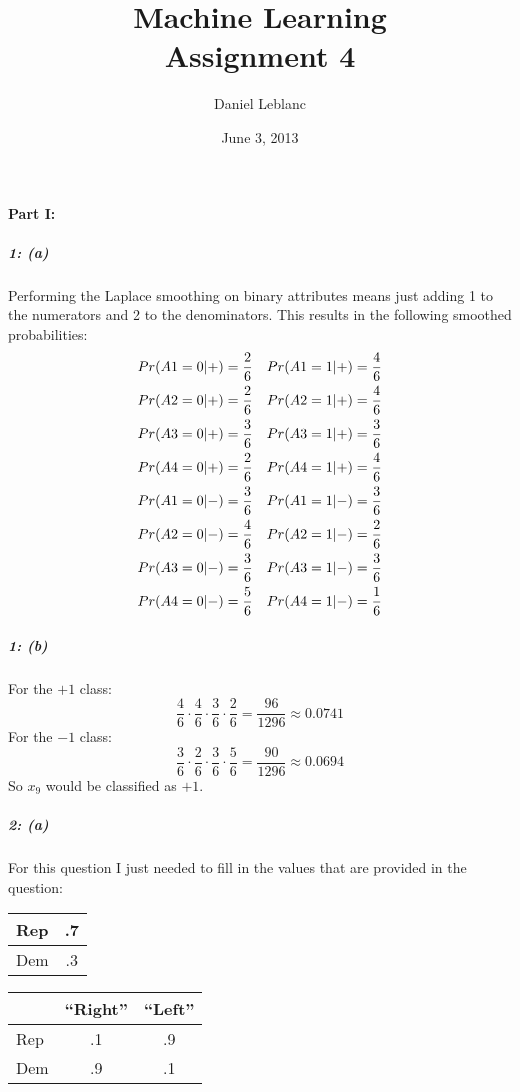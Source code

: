 \documentclass[11pt]{article}
\title{Machine Learning\\ Assignment 4}
\author{Daniel Leblanc}
\date{June 3, 2013}
\begin{document}
\maketitle

\paragraph{Part I:}
\subparagraph{1: (a)} Performing the Laplace smoothing on binary attributes means just adding 1 to the numerators and 2 to the denominators.  This results in the following smoothed probabilities:
\begin{align}
  Pr(A1=0|+) &= \frac26 &  Pr(A1=1|+) &= \frac46 \notag\\
  Pr(A2=0|+) &= \frac26 &  Pr(A2=1|+) &= \frac46 \notag\\
  Pr(A3=0|+) &= \frac36 &  Pr(A3=1|+) &= \frac36 \notag\\
  Pr(A4=0|+) &= \frac26 &  Pr(A4=1|+) &= \frac46 \notag\\
  Pr(A1=0|-) &= \frac36 &  Pr(A1=1|-) &= \frac36 \notag\\
  Pr(A2=0|-) &= \frac46 &  Pr(A2=1|-) &= \frac26 \notag\\
  Pr(A3=0|-) &= \frac36 &  Pr(A3=1|-) &= \frac36 \notag\\
  Pr(A4=0|-) &= \frac56 &  Pr(A4=1|-) &= \frac16 \notag
\end{align}
\subparagraph{1: (b)} For the $+1$ class:
\[\frac46 \cdot \frac46 \cdot \frac36 \cdot \frac26 = \frac{96}{1296} \approx 0.0741\]
For the $-1$ class:
\[\frac36 \cdot \frac26 \cdot \frac36 \cdot \frac56 = \frac{90}{1296} \approx 0.0694\]
So $x_9$ would be classified as $+1$.

\subparagraph{2: (a)} For this question I just needed to fill in the values that are provided in the question:
\begin{center}
\begin{tabular}{|l|c|}
  \hline Rep & .7 \\
  \hline Dem & .3 \\
  \hline
\end{tabular}
\end{center}

\begin{center}
\begin{tabular}{|l|c|c|}
  \hline & ``Right'' & ``Left'' \\
  \hline Rep & .1 & .9 \\
  \hline Dem & .9 & .1 \\
  \hline
\end{tabular}
\end{center}
\end{document}
